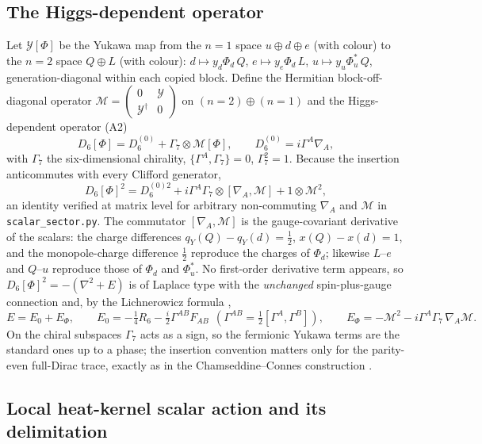 \documentclass[11pt,letterpaper]{article}
\newcommand{\Mb}{\mathcal M}
\newcommand{\Yb}{\mathcal Y}
\begin{document}
\subsection{The Higgs-dependent operator}

Let $\Yb[\Phi]$ be the Yukawa map from the $n=1$ space $u\oplus d\oplus e$ (with colour) to the $n=2$ space $Q\oplus L$ (with colour): $d\mapsto y_d\Phi_d\,Q$, $e\mapsto y_e\Phi_d\,L$, $u\mapsto y_u\Phi_u^{*}\,Q$, generation-diagonal within each copied block. Define the Hermitian block-off-diagonal operator $\Mb=\begin{pmatrix}0&\Yb\\ \Yb^\dagger&0\end{pmatrix}$ on $(n{=}2)\oplus(n{=}1)$ and the Higgs-dependent operator (A2)
\begin{equation}
D_6[\Phi]=D_6^{(0)}+\Gamma_7\otimes\Mb[\Phi],\qquad D_6^{(0)}=i\Gamma^A\nabla_A,
\end{equation}
with $\Gamma_7$ the six-dimensional chirality, $\{\Gamma^A,\Gamma_7\}=0$, $\Gamma_7^2=1$. Because the insertion anticommutes with every Clifford generator,
\begin{equation}
D_6[\Phi]^2=D_6^{(0)2}+i\Gamma^A\Gamma_7\otimes[\nabla_A,\Mb]+1\otimes\Mb^2,
\label{eq:square}
\end{equation}
an identity verified at matrix level for arbitrary non-commuting $\nabla_A$ and $\Mb$ in \texttt{scalar\_sector.py}. The commutator $[\nabla_A,\Mb]$ is the gauge-covariant derivative of the scalars: the charge differences $q_Y(Q)-q_Y(d)=\tfrac12$, $x(Q)-x(d)=1$, and the monopole-charge difference $\tfrac12$ reproduce the charges of $\Phi_d$; likewise $L$--$e$ and $Q$--$u$ reproduce those of $\Phi_d$ and $\Phi_u^{*}$. No first-order derivative term appears, so $D_6[\Phi]^2=-(\nabla^2+E)$ is of Laplace type with the \emph{unchanged} spin-plus-gauge connection and, by the Lichnerowicz formula \cite{Lich},
\begin{equation}
E=E_0+E_\Phi,\qquad E_0=-\tfrac14R_6-\tfrac i2\Gamma^{AB}F_{AB}\ \ (\Gamma^{AB}=\tfrac12[\Gamma^A,\Gamma^B]),\qquad E_\Phi=-\Mb^2-i\Gamma^A\Gamma_7\,\nabla_A\Mb .
\end{equation}
On the chiral subspaces $\Gamma_7$ acts as a sign, so the fermionic Yukawa terms are the standard ones up to a phase; the insertion convention matters only for the parity-even full-Dirac trace, exactly as in the Chamseddine--Connes construction \cite{CC97,CCM}.

\subsection{Local heat-kernel scalar action and its delimitation}
\end{document}
